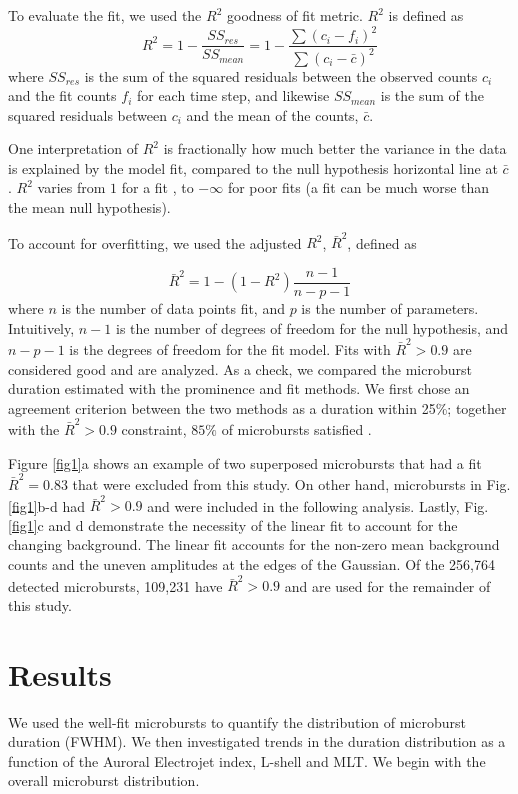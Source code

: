 \documentclass[draft]{agujournal2019}
\begin{document}
To evaluate the fit, we used the $R^2$ goodness of fit metric. $R^2$ is defined as
\begin{equation}
R^2 = 1 - \frac{SS_{res}}{SS_{mean}} = 1 - \frac{\sum{(c_i-f_i)^2}}{\sum{(c_i-\bar{c})^2}}
\end{equation} where $SS_{res}$ is the sum of the squared residuals between the observed counts $c_i$ and the fit counts $f_i$ for each time step, and likewise $SS_{mean}$ is the sum of the squared residuals between $c_i$ and the mean of the counts, $\bar{c}$.

One interpretation of $R^2$ is fractionally how much better the variance in the data is explained by the model fit, compared to the null hypothesis horizontal line at $\bar{c}$. $R^2$ varies from $1$ for a  fit , to $-\infty$ for poor fits (a fit can be much worse than the mean null hypothesis).

To account for overfitting, we used the adjusted $R^2$, $\bar{R}^2$, defined as

\begin{equation}
\bar{R}^2 = 1 - (1-R^2) \frac{n-1}{n-p-1}
\end{equation} where $n$ is the number of data points fit, and $p$ is the number of parameters. Intuitively, $n-1$ is the number of degrees of freedom for the null hypothesis, and $n-p-1$ is the degrees of freedom for the fit model. Fits with $\bar{R}^2 > 0.9$ are considered good and are analyzed. As a check, we compared the microburst duration estimated with the prominence and fit methods. We first chose an agreement criterion between the two methods as a duration within 25\%; together with the $\bar{R}^2 > 0.9$ constraint, $85\%$ of microbursts satisfied .

Figure \ref{fig1}a shows an example of two superposed microbursts that had a fit $\bar{R}^2 = 0.83$ that were excluded from this study. On other hand, microbursts in Fig. \ref{fig1}b-d had $\bar{R}^2 > 0.9$ and were included in the following analysis. Lastly, Fig. \ref{fig1}c and d demonstrate the necessity of the linear fit to account for the changing background. The linear fit accounts for the non-zero mean background counts and the uneven amplitudes at the edges of the Gaussian. Of the 256,764 detected microbursts, 109,231 have $\bar{R}^2 > 0.9$ and are used for the remainder of this study.

\section{Results}\label{results}
We used the well-fit microbursts to quantify the distribution of microburst duration (FWHM). We then investigated trends in the duration distribution as a function of the Auroral Electrojet index, L-shell and MLT. We begin with the overall microburst distribution.
\end{document}
